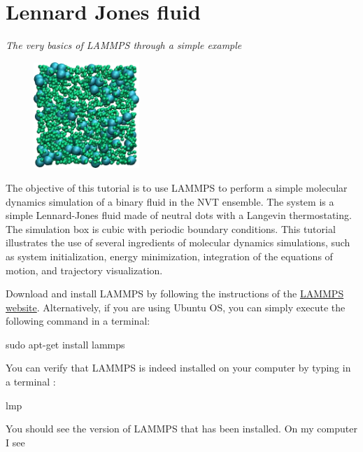 \chapter{Lennard Jones fluid}

\vspace{-1cm} \noindent \textcolor{graytitle}{\textit{{\Large The very basics of LAMMPS through a simple example}}\vspace{0.5cm} }

\noindent \begin{figure}
\begin{center}
\includegraphics[width=4cm]{tutorials/level0/lennard-jones-fluid/binary_LJ_fluid_light.png}
\end{center}
\end{figure}

The objective of this tutorial is to use
LAMMPS to perform a simple molecular dynamics simulation
of a binary fluid in the NVT ensemble. The system is a simple Lennard-Jones fluid
made of neutral dots with a Langevin thermostating. The
simulation box is cubic with periodic boundary conditions.
This tutorial illustrates the use of several ingredients of
molecular dynamics simulations, such as system initialization,
energy minimization, integration of the equations of motion,
and trajectory visualization.

Download and install LAMMPS by following the instructions of the \href{https://lammps.sandia.gov}{LAMMPS website}.
Alternatively, if you are using Ubuntu OS, you can simply execute the
following command in a terminal:

\begin{lcverbatim}
sudo apt-get install lammps
\end{lcverbatim}

\noindent You can verify that LAMMPS is indeed installed on your
computer by typing in a terminal :

\begin{lcverbatim}
lmp
\end{lcverbatim}

\noindent You should see the version of LAMMPS that has been
installed. On my computer I see

